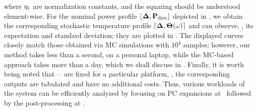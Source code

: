 where $\eta_i$ are normalization constants, and the squaring should be understood element-wise. For the nominal power profile $\profPdyn$ depicted in , we obtain the corresponding stochastic temperature profile $\profT{\o}$ and can observe, \eg, its expectation and standard deviation; they are plotted in . The displayed curves closely match those obtained via MC simulations with $10^4$ samples; however, our method takes less than a second, on a personal laptop, while the MC-based approach takes more than a day, which we shall discuss in . Finally, it is worth being noted that --\ are fixed for a particular platform, \ie, the corresponding outputs are tabulated and have no additional costs. Thus, various workloads of the system can be efficiently analyzed by focusing on PC expansions at \ followed by the post-processing at .
